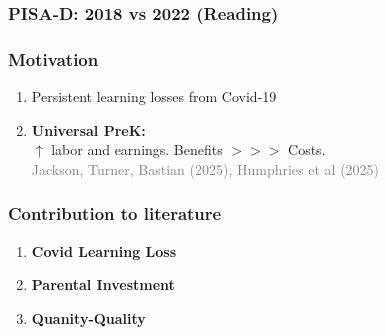 \documentclass{beamer}
\begin{document}
\begin{frame}
    \label{update_scott}
    \frametitle{PISA-D: 2018 vs 2022 (Reading)}
        {
    }
\end{frame}


\begin{frame}
    \label{update_scott}
    \frametitle{Motivation}
    \begin{enumerate}
        \item Persistent learning losses from Covid-19
        \item \textbf{Universal PreK:} \\
        $\uparrow$ labor and earnings. Benefits $>>>$ Costs. \\
        \small \textcolor{grey}{Jackson, Turner, Bastian (2025), Humphries et al (2025)}
    \end{enumerate}
\end{frame}

\begin{frame}
    \label{update_scott}
    \frametitle{Contribution to literature}
    \begin{enumerate}
        \item \textbf{Covid Learning Loss} \\
        \item \textbf{Parental Investment} \\
        \item \textbf{Quanity-Quality} \\

    \end{enumerate}
\end{frame}

\end{document}
